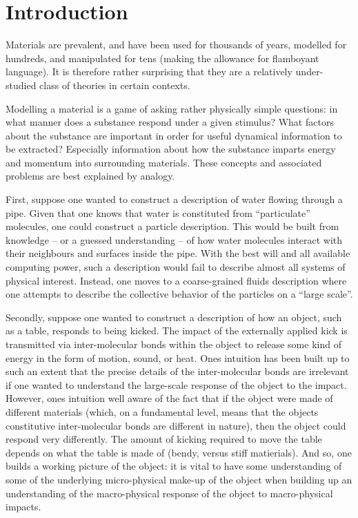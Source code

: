 \section{Introduction}
Materials are prevalent, and have been used for thousands of years, modelled for hundreds, and manipulated for tens (making the allowance  for flamboyant language). It is therefore rather surprising that they are a relatively under-studied class of theories in certain contexts. 



Modelling a material is a game of asking rather physically simple questions: in what manner does  a substance respond under a given stimulus? What factors about the substance are important in order for useful dynamical information to be extracted? Especially information about how the substance imparts energy and momentum into surrounding materials. These concepts and associated problems are best explained by analogy.


First, suppose one wanted to construct a description of water flowing through a pipe. Given that one knows that water is constituted from ``particulate'' molecules,  one could construct a particle description. This would be built from knowledge -- or a guessed understanding -- of how water molecules interact with their neighbours and surfaces inside the pipe. With the best will and all available computing power, such a description would fail to describe almost all systems of physical interest. Instead, one moves to a coarse-grained fluids description where one attempts to describe the collective behavior of the particles on a ``large scale''.  

Secondly, suppose one wanted to construct a description of how an object, such as a table, responds to being kicked. The impact of the externally applied kick is transmitted via inter-molecular bonds within the object to release some kind of energy in the form of motion, sound, or heat.  Ones intuition has been built up to such an extent that the precise details of the inter-molecular bonds are irrelevant if one wanted to understand the large-scale response of the object to the impact. However, ones intuition well aware of the fact that if the object were made of different materials (which, on a fundamental level, means that the objects constitutive inter-molecular bonds are  different in nature), then the object could respond very differently. The amount of kicking required to move the table depends on what the table is made of (bendy, versus stiff matierials). And so, one builds a working picture of the object: it is vital to have some understanding of some of the underlying micro-physical make-up of the object when building up an understanding of the macro-physical response of the object to macro-physical impacts. 

